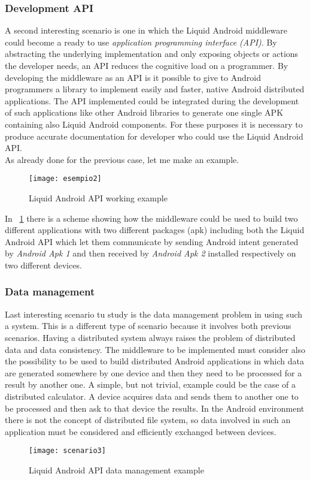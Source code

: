 \subsubsection{Development API} A second interesting scenario is one in which the Liquid Android middleware could become a ready to use \textit{application programming interface (API)}. By abstracting the underlying implementation and only exposing objects or actions the developer needs, an API reduces the cognitive load on a programmer. By developing the middleware as an API is it possible to give to Android programmers a library to implement easily and faster, native Android distributed applications. The API implemented could be integrated during the development of such applications like other Android libraries to generate one single APK containing also Liquid Android components. For these purposes it is necessary to produce accurate documentation for developer who could use the Liquid Android API.\\
As already done for the previous case, let me make an example.
\begin{figure}[h]
	\centering
	\texttt{[image: esempio2]}
	\caption{Liquid Android API working example}
	\label{fig:3.4}
\end{figure}
In \figurename~\ref{fig:3.4} there is a scheme showing how the middleware could be used to build two different applications with two different packages (apk) including both the Liquid Android API which let them communicate by sending Android intent generated by \textit{Android Apk 1} and then received by \textit{Android Apk 2} installed respectively on two different devices.

\subsubsection{Data management} Last interesting scenario tu study is the data management problem in using such a system. This is a different type of scenario because it involves both previous scenarios. Having a distributed system always raises the problem of distributed data and data consistency. The middleware to be implemented must consider also the possibility to be used to build distributed Android applications in which data are generated somewhere by one device and then they need to be processed for a result by another one. A simple, but not trivial, example could be the case of a distributed calculator. A device acquires data and sends them to another one to be processed and then ask to that device the results. In the Android environment there is not the concept of distributed file system, so data involved in such an application must be considered and efficiently exchanged between devices.
\begin{figure}[h]
	\centering
	\texttt{[image: scenario3]}
	\caption{Liquid Android API data management example}
	\label{fig:3.5}
\end{figure}

